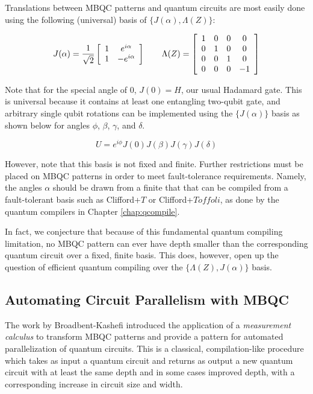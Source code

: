 Translations between MBQC patterns and quantum circuits are most easily
done using the following (universal) basis of $\{J(\alpha), \Lambda(Z)\}$:

\begin{equation}
J(\alpha) = \frac{1}{\sqrt{2}} \left[
\begin{array}{cc}
1 & e^{i\alpha} \\
1 & -e^{i\alpha}
\end{array}
\right]
\qquad
\Lambda(Z) = \left[
\begin{array}{cccc}
1 & 0 & 0 & 0 \\
0 & 1 & 0 & 0 \\
0 & 0 & 1 & 0 \\
0 & 0 & 0 & -1
\end{array}
\right]
\end{equation}

Note that for the special angle of $0$,
$J(0) = H$, our usual Hadamard gate.
This is universal because it contains at least one entangling two-qubit
gate, and arbitrary single qubit rotations can be implemented using
the $\{J(\alpha)\}$ basis as shown below for angles $\phi$, $\beta$, $\gamma$,
and $\delta$.

\begin{equation}
U = e^{i\phi}J(0)J(\beta)J(\gamma)J(\delta)
\end{equation}

However, note that this basis is not
fixed and finite. Further restrictions must be placed on MBQC patterns
in order to meet fault-tolerance requirements. Namely, the angles
$\alpha$ should be drawn from a finite that that can be compiled from
a fault-tolerant basis such as Clifford+$T$ or Clifford+$Toffoli$, as
done by the quantum compilers in Chapter \ref{chap:qcompile}.

In fact, we conjecture that because of this fundamental quantum
compiling limitation, no MBQC pattern can ever have depth smaller than
the corresponding quantum circuit over a fixed, finite basis. This does,
however, open up the question of efficient quantum compiling over
the $\{\Lambda(Z), J(\alpha)\}$ basis.

\subsection{Automating Circuit Parallelism with MBQC}
\label{subsec:mbqc-par}

The work by Broadbent-Kashefi introduced the application of a
\emph{measurement calculus} to transform MBQC patterns and provide a
pattern for automated parallelization of quantum circuits. This is a
classical, compilation-like procedure which takes as input a quantum
circuit and returns as output a new quantum circuit with at least the
same depth and in some cases improved depth, with a corresponding
increase in circuit size and width.

